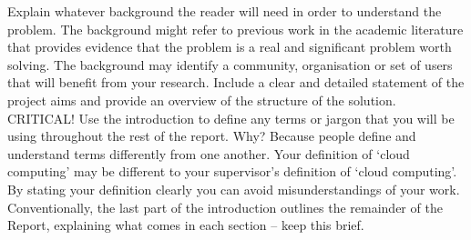 Explain whatever background the reader will need in order to understand the problem. The background might refer to previous work in the academic literature that provides evidence that the problem is a real and significant problem worth solving. The background may identify a community, organisation or set of users that will benefit from your research. Include a clear and detailed statement of the project aims and provide an overview of the structure of the solution.
CRITICAL! Use the introduction to define any terms or jargon that you will be using throughout the rest of the report.  Why?  Because people define and understand terms differently from one another.  Your definition of ‘cloud computing’ may be different to your supervisor’s definition of ‘cloud computing’.  By stating your definition clearly you can avoid misunderstandings of your work.
Conventionally, the last part of the introduction outlines the remainder of the Report, explaining what comes in each section – keep this brief.

